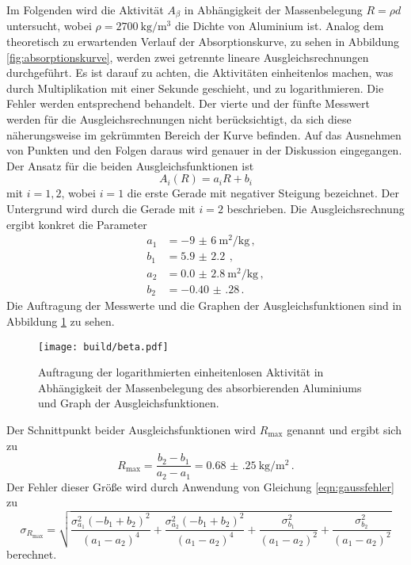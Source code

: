 Im Folgenden wird die Aktivität $A_\beta$ in Abhängigkeit der Massenbelegung $R = \rho d$
untersucht, wobei $\rho = \SI{2700}{\kilo\gram\per\meter\cubed}$ die Dichte von Aluminium ist.
Analog dem theoretisch zu erwartenden Verlauf der Absorptionskurve, zu sehen in Abbildung \ref{fig:absorptionskurve},
werden zwei getrennte lineare Ausgleichsrechnungen durchgeführt. Es ist darauf zu achten, die Aktivitäten
einheitenlos machen, was durch Multiplikation mit einer Sekunde geschieht, und zu logarithmieren. Die Fehler werden entsprechend behandelt. Der vierte und der fünfte Messwert
werden für die Ausgleichsrechnungen nicht berücksichtigt, da sich diese näherungsweise im gekrümmten Bereich
der Kurve befinden. Auf das Ausnehmen von Punkten und den Folgen daraus wird genauer in der Diskussion eingegangen.
Der Ansatz für die beiden Ausgleichsfunktionen ist
\begin{equation*}
  A_i(R) = a_i R + b_i
\end{equation*}
mit $i=1{,}2$, wobei $i=1$ die erste Gerade mit negativer Steigung bezeichnet. Der Untergrund
wird durch die Gerade mit $i=2$ beschrieben.
Die Ausgleichsrechnung ergibt konkret die Parameter
\begin{align*}
  a_1 &= \SI{-9(6)}{\meter\squared\per\kilo\gram}\,,\\
  b_1 &= \SI{5.9(22)}{}\,,\\
  a_2 &= \SI{0.0(28)}{\meter\squared\per\kilo\gram}\,,\\
  b_2 &= \SI{-0.40(28)}\,.
\end{align*}
Die Auftragung der Messwerte und die Graphen der Ausgleichsfunktionen sind in Abbildung \ref{fig:beta} zu sehen.
\begin{figure}
  \centering
  \texttt{[image: build/beta.pdf]}
  \caption{Auftragung der logarithmierten einheitenlosen Aktivität in Abhängigkeit der Massenbelegung des absorbierenden Aluminiums und Graph der Ausgleichsfunktionen.}
  \label{fig:beta}
\end{figure}
Der Schnittpunkt beider Ausgleichsfunktionen wird $R_\text{max}$ genannt und ergibt sich zu
\begin{equation*}
  R_\text{max} = \frac{b_2-b_1}{a_2-a_1} = \SI{0.68(25)}{\kilo\gram\per\meter\squared}\,.
\end{equation*}
Der Fehler dieser Größe wird durch Anwendung von Gleichung \eqref{eqn:gaussfehler}
zu
\begin{equation*}
  \sigma_{R_\text{max}} =
  \sqrt{\frac{\sigma_{a_{1}}^{2} \left(- b_{1} + b_{2}\right)^{2}}{\left(a_{1} - a_{2}\right)^{4}}
  + \frac{\sigma_{a_{2}}^{2} \left(- b_{1} + b_{2}\right)^{2}}{\left(a_{1} - a_{2}\right)^{4}}
  + \frac{\sigma_{b_{1}}^{2}}{\left(a_{1} - a_{2}\right)^{2}} + \frac{\sigma_{b_{2}}^{2}}{\left(a_{1} - a_{2}\right)^{2}}}
\end{equation*}
berechnet.

